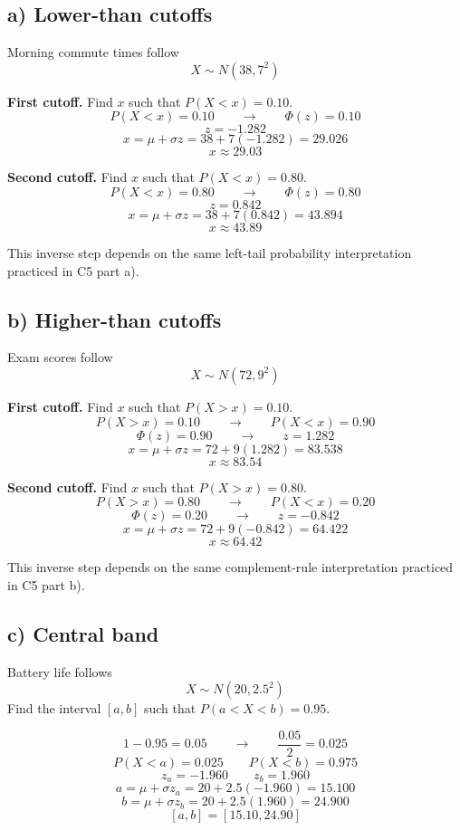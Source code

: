 \subsection*{a) Lower-than cutoffs}
\label{subsec:inverse-normal-problems-c7-a}
Morning commute times follow
\[
X\sim N(38,7^2)
\]

\textbf{First cutoff.} Find \(x\) such that \(P(X<x)=0.10\).
\[
P(X<x)=0.10
\qquad \longrightarrow \qquad
\Phi(z)=0.10
\]
\[
z=-1.282
\]
\[
x=\mu+\sigma z
=38+7(-1.282)
=29.026
\]
\[
x\approx 29.03
\]

\textbf{Second cutoff.} Find \(x\) such that \(P(X<x)=0.80\).
\[
P(X<x)=0.80
\qquad \longrightarrow \qquad
\Phi(z)=0.80
\]
\[
z=0.842
\]
\[
x=\mu+\sigma z
=38+7(0.842)
=43.894
\]
\[
x\approx 43.89
\]

This inverse step depends on the same left-tail probability interpretation practiced in C5 part a).


\subsection*{b) Higher-than cutoffs}
\label{subsec:inverse-normal-problems-c7-b}
Exam scores follow
\[
X\sim N(72,9^2)
\]

\textbf{First cutoff.} Find \(x\) such that \(P(X>x)=0.10\).
\[
P(X>x)=0.10
\qquad \longrightarrow \qquad
P(X<x)=0.90
\]
\[
\Phi(z)=0.90
\qquad \longrightarrow \qquad
z=1.282
\]
\[
x=\mu+\sigma z
=72+9(1.282)
=83.538
\]
\[
x\approx 83.54
\]

\textbf{Second cutoff.} Find \(x\) such that \(P(X>x)=0.80\).
\[
P(X>x)=0.80
\qquad \longrightarrow \qquad
P(X<x)=0.20
\]
\[
\Phi(z)=0.20
\qquad \longrightarrow \qquad
z=-0.842
\]
\[
x=\mu+\sigma z
=72+9(-0.842)
=64.422
\]
\[
x\approx 64.42
\]

This inverse step depends on the same complement-rule interpretation practiced in C5 part b).


\subsection*{c) Central band}
\label{subsec:inverse-normal-problems-c7-c}
Battery life follows
\[
X\sim N(20,2.5^2)
\]
Find the interval \([a,b]\) such that \(P(a<X<b)=0.95\).

\[
1-0.95=0.05
\qquad \longrightarrow \qquad
\frac{0.05}{2}=0.025
\]
\[
P(X<a)=0.025
\qquad
P(X<b)=0.975
\]
\[
z_a=-1.960
\qquad
z_b=1.960
\]
\[
a=\mu+\sigma z_a
=20+2.5(-1.960)
=15.100
\]
\[
b=\mu+\sigma z_b
=20+2.5(1.960)
=24.900
\]
\[
[a,b]=[15.10,24.90]
\]

